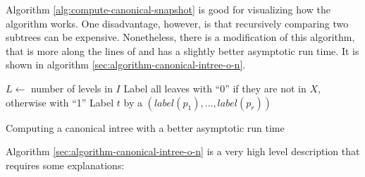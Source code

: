 Algorithm \ref{alg:compute-canonical-snapshot} is good for visualizing how the algorithm works. One disadvantage, however, is that recursively comparing two subtrees can be expensive. Nonetheless, there is a modification of this algorithm, that is more along the lines of \cite{aho1974design} and has a slightly better asymptotic run time. It is shown in algorithm \ref{sec:algorithm-canonical-intree-o-n}.

\begin{algorithm}
  \begin{algorithmic}[5]
      \State $L \gets $ number of levels in $I$
      \State Label all leaves with ``0'' if they are not in $X$, otherwise with ``1''
        \label{alg:canonical-intree-inner-loop}
          \State Label $t$ by a $(label(p_1),\dots,label(p_r))$ 
          \label{alg:canonical-intree-concatenate-line}
        \EndFor
        \label{alg:canonical-intree-sorting-line}
        \label{alg:canonical-intree-numbering-line}
      \EndFor
    \EndProcedure
  \end{algorithmic}
  \caption{Computing a canonical intree with a better asymptotic run time}
  \label{sec:algorithm-canonical-intree-o-n}
\end{algorithm}

Algorithm \ref{sec:algorithm-canonical-intree-o-n} is a very high level description that requires some explanations:


